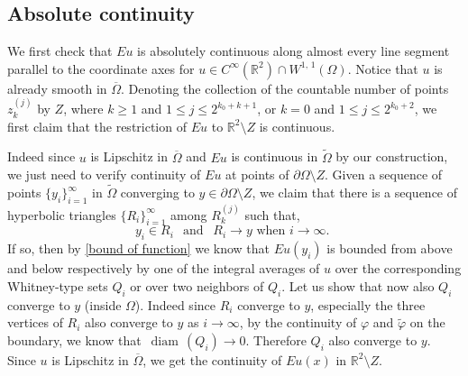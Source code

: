 \documentclass[reqno,11pt]{amsart}
\def\wz{\widetilde}
\def\diam{{\mathop\mathrm{\,diam\,}}}
\numberwithin{equation}{section}
\theoremstyle{remark}
\begin{document}
\subsection{Absolute continuity}\label{sec:jordanabscont}%

We first check that $Eu$ is absolutely continuous along almost every line segment parallel to the 
coordinate axes for $u\in C^{\infty}(\mathbb R^2)\cap W^{1,\,1}(\Omega)$. 
Notice that $u$ is already smooth in $\overline{\Omega}$. %
Denoting the collection of the countable number of points $z_k^{(j)}$ by $Z$,   where  $k\ge 1$ and $1\le j\le 2^{k_0+k+1}$, or $k=0$ and $1\le j\le 2^{k_0+2}$,
we first claim that the restriction of $Eu$ to $\mathbb R^2 \setminus Z$ is continuous. 


Indeed since $u$ is Lipschitz in $\overline{\Omega}$ and $Eu$ is continuous
in $\wz \Omega$ by our construction, we just need to verify continuity
of $Eu$ at points of $\partial\Omega\setminus Z$. Given a sequence of 
points $\{y_i\}_{i=1}^{\infty}$ in $\wz \Omega$ converging to 
$y\in \partial\Omega\setminus Z$, we claim that there is
a sequence of hyperbolic triangles $\{R_i\}_{i=1}^{\infty}$ among  $R_k^{(j)}$ 
such that, 
\begin{equation}\label{equat 3}
 y_i\in R_i \ \, \text{ and } \ \ R_i \to  y  \text{ when $i\to \infty$. }
\end{equation}
If so, then by \eqref{bound of function} we know that $Eu(y_i)$ is 
bounded from above and below respectively by one of the integral averages of $u$ over 
the corresponding Whitney-type sets $Q_i$ or over two neighbors of $Q_i$. 
Let us show that now also $Q_i$ converge to $y$ (inside $\Omega$). 
Indeed since $R_i$ converge to $y$, especially the three vertices of $R_i$ also converge to $y$ as $i\to \infty$, by the continuity of $\varphi$ and $\wz \varphi$ on the boundary, we know that $\diam(Q_i)\to 0$. Therefore $Q_i$  also converge to $y$. 
Since $u$ is Lipschitz in $\overline{\Omega}$, we 
get the continuity of $Eu(x)$ in $\mathbb R^2\setminus Z$. 
\end{document}
